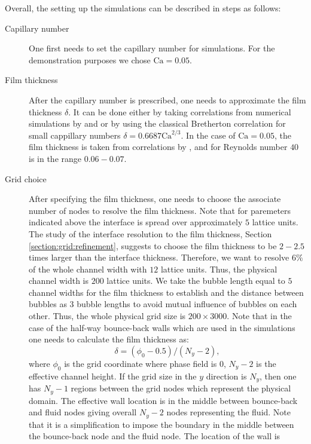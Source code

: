 \documentclass[preprint,12pt]{elsarticle}
\newcommand{\Ca}{\mathrm{Ca}}
\begin{document}
{Overall, the setting up the simulations can be described in steps as follows:
\begin{description}
 \item[Capillary number] One first needs to set the capillary number for
simulations. For the demonstration purposes we chose $\Ca=0.05$. 
 \item[Film thickness] After the capillary number is prescribed, one needs to approximate the film
thickness $\delta$. It can be done either by taking correlations from numerical simulations by
\citet{heil-bretherton} and \citet{giavedoni-numerical} or by using the classical Bretherton
correlation for small cappillary numbers $\delta=0.6687 \Ca^{2/3}$. In the case of $\Ca=0.05$, the 
film thickness is taken from correlations by \citet{heil-bretherton} 
, and for Reynolds number $40$ is in the range $0.06-0.07$.  
\item[Grid choice] After specifying the film thickness, one needs to choose the associate
number of nodes to resolve the film thickness. Note that for paremeters indicated above the
interface is spread over approximately $5$ lattice units. The study of the interface
resolution to the film thickness, Section \ref{section:grid:refinement}, suggests to choose the
film thickness to be $2-2.5$ times larger than the interface thickness. Therefore, we want to
  resolve $6\%$ of the whole channel width with $12$ lattice units.  Thus, the physical channel
  width is $200$ lattice units. We take the bubble length equal to $5$ channel widths for the film
thickness to establish
  and the distance between bubbles as $3$ bubble lengths to avoid mutual influence of bubbles on
each other. Thus, the whole physical grid size is $200 \times 3000$. Note that in the case of the
half-way bounce-back walls \cite{yu} which are used in the
simulations one needs to calculate the film thickness as:
\begin{equation}
\delta=(\phi_0-0.5)/(N_y-2),
\end{equation}
where $\phi_0$ is the grid coordinate where phase field is $0$, $N_y-2$
is the effective channel height.
If the grid size in the $y$ direction is $N_y$, then one has $N_y-1$ regions between the grid nodes
which represent
the physical domain. The effective wall location is in the middle between bounce-back and fluid
nodes giving
overall $N_y-2$ nodes representing the fluid. Note that it is a simplification to impose the
boundary in the middle between the bounce-back
node and the fluid node. The location of the wall is

\end{description}}
\end{document}
